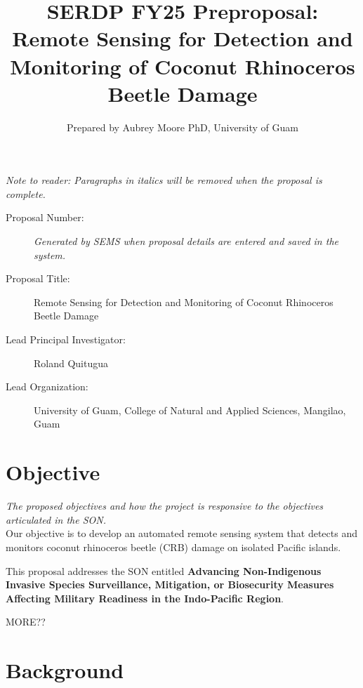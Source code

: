 \documentclass[11pt,english,letterpaper]{scrartcl}
\begin{document}
\title{SERDP FY25 Preproposal: Remote Sensing for Detection and Monitoring of Coconut Rhinoceros Beetle Damage}
\author{Prepared by Aubrey Moore PhD, University of Guam}

\maketitle

\tableofcontents{}\clearpage{}

\textit{Note to reader: Paragraphs in italics will be removed when the proposal is complete.}

\begin{description}
	
\item[Proposal Number:] \emph{Generated by SEMS when proposal details are entered and saved in the system.}

\item[Proposal Title:] Remote Sensing for Detection and Monitoring of Coconut Rhinoceros Beetle Damage

\item[Lead Principal Investigator:] Roland Quitugua

\item[Lead Organization:] University of Guam, College of Natural and Applied Sciences, Mangilao, Guam

\end{description}

\section{Objective}

\textit{The proposed objectives and how the project is responsive to the objectives
	articulated in the SON.}\\

Our objective is to develop an automated remote sensing system that detects and monitors coconut rhinoceros beetle (CRB) damage on isolated Pacific islands. 

This proposal addresses the SON entitled \textbf{Advancing Non-Indigenous Invasive Species Surveillance, Mitigation, or Biosecurity Measures Affecting Military Readiness in the Indo-Pacific Region}.

MORE??

\section{Background}
\end{document}
